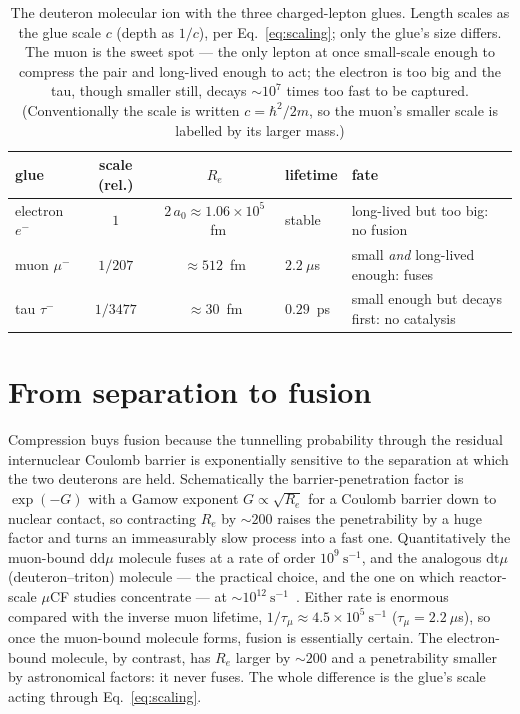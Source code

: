 \documentclass[11pt]{article}
\begin{document}
\begin{table}[h]
\centering
\small
\setlength{\tabcolsep}{5pt}
\renewcommand{\arraystretch}{1.2}
\begin{tabular}{lccll}
\toprule
glue & scale (rel.) & $R_e$ & lifetime & fate\\
\midrule
electron $e^-$ & $1$       & $2\,a_0\approx1.06\times10^{5}$~fm & stable        & long-lived but too big: no fusion\\
muon $\mu^-$   & $1/207$   & $\approx512$~fm                    & $2.2~\mu$s    & small \emph{and} long-lived enough: fuses\\
tau $\tau^-$   & $1/3477$  & $\approx30$~fm                     & $0.29$~ps     & small enough but decays first: no catalysis\\
\bottomrule
\end{tabular}
\caption{The deuteron molecular ion with the three charged-lepton glues. Length scales as the glue scale
$c$ (depth as $1/c$), per Eq.~\eqref{eq:scaling}; only the glue's size differs. The muon is the sweet
spot --- the only lepton at once small-scale enough to compress the pair and long-lived enough to act;
the electron is too big and the tau, though smaller still, decays $\sim\!10^{7}$ times too fast to be
captured. (Conventionally the scale is written
$c=\hbar^2/2m$, so the muon's smaller scale is labelled by its larger mass.)}
\label{tab:glue}
\end{table}

\section{From separation to fusion}

Compression buys fusion because the tunnelling probability through the residual internuclear Coulomb
barrier is exponentially sensitive to the separation at which the two deuterons are held. Schematically
the barrier-penetration factor is $\exp(-G)$ with a Gamow exponent $G\propto\sqrt{R_e}$ for a Coulomb
barrier down to nuclear contact, so contracting $R_e$ by $\sim\!200$ raises the penetrability by a huge
factor and turns an immeasurably slow process into a fast one. Quantitatively the muon-bound
$\mathrm{dd}\mu$ molecule fuses at a rate of order $10^{9}~\mathrm{s^{-1}}$, and the analogous
$\mathrm{dt}\mu$ (deuteron--triton) molecule --- the practical choice, and the one on which reactor-scale
$\mu$CF studies concentrate --- at $\sim\!10^{12}~\mathrm{s^{-1}}$~\cite{Breunlich}. Either rate is
enormous compared with the inverse muon lifetime, $1/\tau_\mu\approx4.5\times10^{5}~\mathrm{s^{-1}}$
($\tau_\mu=2.2~\mu$s), so once the muon-bound molecule forms, fusion is essentially certain. The
electron-bound molecule, by contrast, has $R_e$ larger by $\sim\!200$ and a penetrability smaller by
astronomical factors: it never fuses. The whole difference is the glue's scale acting through
Eq.~\eqref{eq:scaling}.
\end{document}
